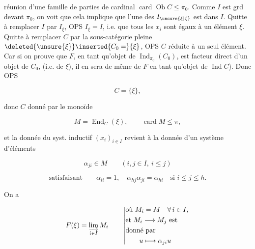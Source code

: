 
réunion d'une famille de parties  de cardinal $\operatorname{card}\operatorname{Ob}C\leq\pi_0$. Comme $I$ est grd devant $\pi_0$, on voit que cela implique que l'une des $I_{\unsure{\xi|\zeta}}$ est  dans $I$. Quitte à remplacer $I$ par $I_\xi$, OPS $I_\xi=I$, i.e. que tous les $x_i$ sont égaux à un  élément $\xi$. Quitte à remplacer $C$ par la sous-catégorie pleine $\deleted{\unsure{\xi}}\inserted{C_0=} \{\xi\}$, OPS $C$ réduite à un seul élément. \unsure{[|(}Car si on prouve que $F$, en tant qu'objet de $\operatorname{Ind}_{\pi_0}(C_0)$, est facteur direct d'un objet de $C_0$, (i.e. de $\xi$), il en sera de même de $F$ en tant qu'objet de $\operatorname{Ind} C$). Donc OPS

\[
C=\{\xi\},
\]

donc $C$ donné par le monoïde

\[
M=\operatorname{End}_C(\xi),\qquad \operatorname{card} M\leq\pi,
\]

et la donnée du syst. inductif $(x_i)_{i\in I}$ revient à la donnée d'un système d'éléments

\[
\alpha_{ji}\in M\qquad (i,j\in I,\ i\leq j)
\]

\[
\text{satisfaisant}\qquad\alpha_{ii}=1,\quad\alpha_{hj}\alpha_{ji}=\alpha_{hi}\quad\text{si }i\leq j\leq h.
\]

On a

\[
F(\xi)=\varinjlim_{i\in I}M_i\qquad \left|\begin{aligned}&\text{où }M_i=M\quad\forall\,i\in I,\\&\text{et }M_i\longrightarrow M_j\ \text{est}\\&\text{donné par}\\ &\qquad u\longmapsto\alpha_{ji}u\end{aligned}\right.
\]
